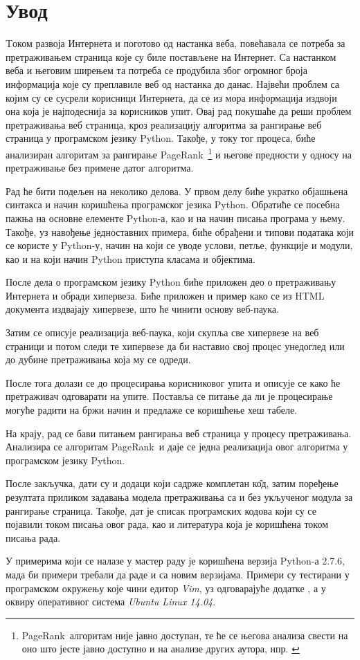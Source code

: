 \section{Увод}

Tоком развоја Интернета и поготово од настанка веба, повећавала се потреба за претраживањем страница које су биле постављене на Интернет. Са настанком веба и његовим ширењем та потреба се продубила због огромног броја информација које су преплавиле веб од настанка до данас. Највећи проблем са којим су се сусрели корисници Интернета, да се из мора информација издвоји она која је најподеснија за корисников упит. Овај рад покушаће да реши проблем претраживања  веб страница, кроз реализацију алгоритма за рангирање веб страница у програмском језику Python. Такође, у току тог процеса, биће анализиран алгоритам за рангирање PageRank\texttrademark\ \footnote{PageRank\texttrademark\ алгоритам није јавно доступан, те ће се његова анализа свести на оно што јесте јавно доступно и на анализе других аутора, нпр. \cite{langville2011google}}  и његове предности у односу на претраживање без примене датог алгоритма.

Рад ће бити подељен на неколико делова. У првом делу биће укратко објашњена синтакса и начин коришћења програмског језика Python. Обратиће се посебна пажња на основне елементе Python-а, као и на начин писања програма у њему. Такође, уз навођење једноставних примера, биће обрађени и типови података који се користе у Python-у, начин на који се уводе услови, петље, функције и модули, као и на који начин Python приступа класама и објектима.

После дела о програмском језику Python биће приложен део о претраживању Интернета и обради хипервеза. Биће приложен и пример како се из HTML документа издвајају хипервезе, што ће чинити основу веб-паука.

Затим се описује реализација веб-паука, који скупља све хипервезе на веб страници и потом следи те хипервезе да би наставио свој процес унедоглед или до дубине претраживања која му се одреди.

После тога долази се до процесирања корисниковог упита и описује се како ће претраживач одговарати на упите. Поставља се питање да ли је процесирање могуће радити на бржи начин и предлаже се коришћење хеш табеле.

На крају, рад се бави питањем рангирања веб страница у процесу претраживања. Анализира се алгоритам PageRank\texttrademark\ и даје се једна реализација овог алгоритма у програмском језику Python.

После закључка, дати су и додаци који садрже комплетан к\^{о}д, затим поређење резултата приликом задавања модела претраживања са и без укљученог модула за рангирање страница. Такође, дат је списак програмских кодова који су се појавили током писања овог рада, као и литература која је коришћена током писања рада.

У примерима који се налазе у мастер раду је коришћена верзија Python-а 2.7.6, мада би примери требали да раде и са новим верзијама. Примери су тестирани у програмском окружењу које чини едитор \emph{Vim}, уз одговарајуће додатке \cite{vim}, а у оквиру оперативног система \emph{Ubuntu Linux 14.04}.



